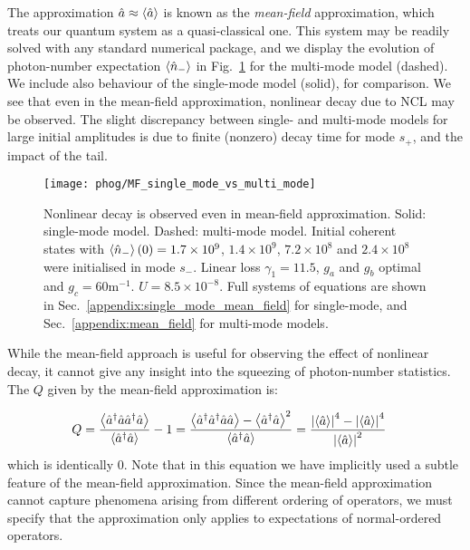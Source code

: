 The approximation $\hat{a} \approx \ev{\hat{a}}$ is known as the \emph{mean-field} approximation, which treats our quantum system as a quasi-classical one. This system may be readily solved with any standard numerical package, and we display the evolution of photon-number expectation $\ev{\hat{n}_-}$ in Fig.~\ref{fig:phog_MF_demonstration} for the multi-mode model (dashed). We include also behaviour of the single-mode model (solid), for comparison. We see that even in the mean-field approximation, nonlinear decay due to NCL may be observed. The slight discrepancy between single- and multi-mode models for large initial amplitudes is due to finite (nonzero) decay time for mode $s_+$, and the impact of the tail.


\begin{figure}[htp]
\captionsetup{width=0.8\linewidth}
\centering
\texttt{[image: phog/MF\_single\_mode\_vs\_multi\_mode]}
\caption{\label{fig:phog_MF_demonstration} Nonlinear decay is observed even in mean-field approximation. Solid: single-mode model. Dashed: multi-mode model. Initial coherent states with $\ev{\hat{n}_-}\left(0\right) = 1.7\times 10^9$, $1.4\times10^9$, $7.2\times10^8$ and $2.4\times10^8$ were initialised in mode $s_-$. Linear loss $\gamma_1 = 11.5$, $g_a$ and $g_b$ optimal and $g_c = 60$m$^{-1}$. $U = 8.5\times10^{-8}$. Full systems of equations are shown in Sec.~\ref{appendix:single_mode_mean_field} for single-mode, and Sec.~\ref{appendix:mean_field} for multi-mode models.}
\end{figure}


While the mean-field approach is useful for observing the effect of nonlinear decay, it cannot give any insight into the squeezing of photon-number statistics. The $Q$ given by the mean-field approximation is:

\begin{align}
Q = \frac{\ev{\hat{a}^\dagger \hat{a} \hat{a}^\dagger \hat{a}}}{\ev{\hat{a}^\dagger \hat{a}}} - 1 &= \frac{\ev{\hat{a}^\dagger \hat{a}^\dagger \hat{a} \hat{a}} - \ev{\hat{a}^\dagger \hat{a}}^2}{\ev{\hat{a}^\dagger \hat{a}}} = \frac{\left|\ev{\hat{a}}\right|^4 - \left|\ev{\hat{a}}\right|^4}{\left|\ev{\hat{a}}\right|^2} \notag
\end{align}
which is identically $0$. Note that in this equation we have implicitly used a subtle feature of the mean-field approximation. Since the mean-field approximation cannot capture phenomena arising from different ordering of operators, we must specify that the approximation only applies to expectations of normal-ordered operators.

